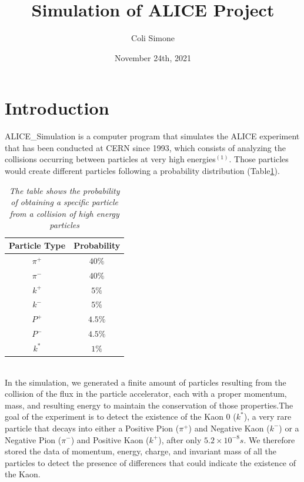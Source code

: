 \documentclass[a4paper, 11pt]{article}
\begin{document}
  \title{Simulation of ALICE Project}
  \author{Coli Simone}
  \date{November 24th, 2021}
  \maketitle
  \section{Introduction}

  ALICE\_Simulation is a computer program that simulates the ALICE experiment that has been conducted at CERN since 1993, which consists of analyzing the collisions occurring between particles at very high energies$^{(1)}$. Those particles would create different particles following a probability distribution (Table\ref{table1}).
    \begin{table}[h!]
      \centering
      \begin{tabular}{ c c }
        \hline
        Particle Type & Probability \\
        \hline
        $\pi^+$ & $40\%$ \\
        $\pi^-$ & $40\%$ \\
        $k^+$ & $5\%$\\
        $k^-$ & $5\%$\\
        $P^+$ & $4.5\%$\\
        $P^-$ & $4.5\%$\\
        $k^*$ & $1\%$\\
        \hline
      \end{tabular}
      \caption{ \label{table1}
      \textit{The table shows the probability of obtaining a specific particle from a collision of high energy particles}
      }
    \end{table}\\

    In the simulation, we generated a finite amount of particles resulting from the collision of the flux in the particle accelerator, each with a proper momentum, mass, and resulting energy to maintain the conservation of those properties.The goal of the experiment is to detect the existence of the Kaon 0 ($k^*$), a very rare particle that decays into either a Positive Pion ($\pi^+$) and Negative Kaon ($k^-$) or a Negative Pion ($\pi^-$) and Positive Kaon ($k^+$), after only $5.2 \times 10^{-8}s$. We therefore stored the data of momentum, energy, charge, and invariant mass of all the particles to detect the presence of differences that could indicate the existence of the Kaon.
\end{document}
